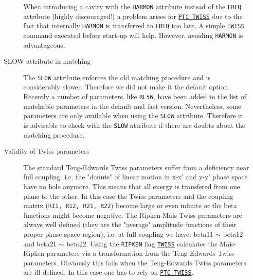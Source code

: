 \begin{description}
  When introducing a cavity with the \texttt{HARMON} attribute instead
  of the \texttt{FREQ} attribute (highly discouraged!) a problem arises
  for  \hyperref[sec:ptc-twiss]{\texttt{PTC\_TWISS}} due to the fact that
  internally \texttt{HARMON} is transferred to \texttt{FREQ} too late. A
  simple \hyperref[chap:twiss]{\texttt{TWISS}} command executed before \ptc
  start-up will help. However, avoiding \texttt{HARMON} is advantageous.
    

\item[SLOW attribute in matching] 
  The \texttt{SLOW} attribute enforces the old matching procedure and is
  considerably slower. Therefore we did not make it the default
  option. Recently a number of parameters, like \texttt{RE56}, have been
  added to the list of matchable parameters in the default and fast
  version. Nevertheless, some parameters are only available when using
  the \texttt{SLOW} attribute. Therefore it is advisable to check with the
  \texttt{SLOW} attribute if there are doubts about the matching procedure.  


\item[Validity of Twiss parameters]
  The standard Teng-Edwards Twiss parameters suffer from a deficiency near
  full coupling: i.e. the "donuts" of linear motion in x-x' and y-y' phase
  space have no hole anymore. This means that all energy is transfered
  from one plane to the other. In this case the Twiss parameters and the
  coupling matrix (\texttt{R11, R12, R21, R22}) become large or even infinite or
  the beta functions might become negative. The Ripken-Mais Twiss
  parameters are always well defined (they are the "average" amplitude
  functions of their proper phase space region), i.e. at full coupling we
  have: beta11 $\sim$ beta12 and beta21 $\sim$ beta22. Using the \texttt{RIPKEN}
  flag \hyperref[chap:twiss]{\texttt{TWISS}} calculates the Mais-Ripken
  parameters via a transformation from the Teng-Edwards Twiss
  parameters. Obviously this fails when the Teng-Edwards Twiss
  parameters are ill defined. In this case one has to rely on
  \hyperref[chap:ptc-twiss]{\texttt{PTC\_TWISS}}.    
  
\end{description}

